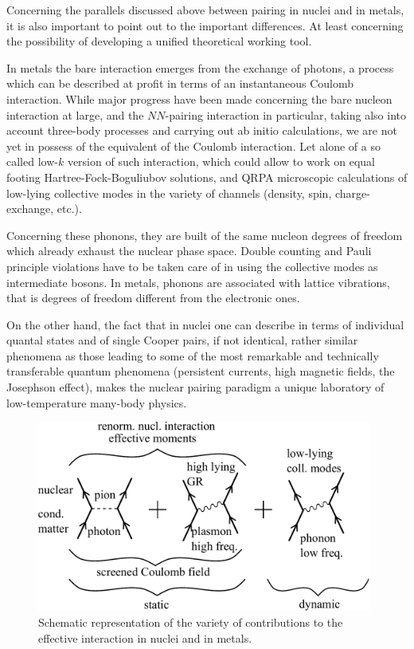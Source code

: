 \begin{subappendices}
Concerning the parallels discussed above between pairing in nuclei and in metals, it is also important to point out to the important differences. At least concerning the possibility of developing a unified theoretical working tool. 

In metals the bare interaction emerges from the exchange of photons, a process which can be described at profit in terms of an instantaneous Coulomb interaction. While major progress have been made concerning the bare nucleon interaction at large, and the $NN$-pairing interaction in particular, taking also into account three-body processes and carrying out ab initio calculations, we are not yet in possess of the equivalent of the Coulomb interaction.  Let alone of a so called low-$k$ version of such interaction, which could allow to work on equal footing Hartree-Fock-Boguliubov solutions, and QRPA microscopic calculations of low-lying collective modes in the variety of channels (density, spin, charge-exchange, etc.).

Concerning these phonons, they are built of the same nucleon degrees of freedom which already exhaust the nuclear phase space. Double counting and Pauli principle violations have to be taken care of in using the collective modes as intermediate bosons. In metals, phonons are associated with lattice vibrations, that is degrees of freedom different from the electronic ones.

On the other hand, the fact that in nuclei one can describe in terms of individual quantal states and of single Cooper pairs, if not identical, rather similar phenomena as those leading to some of the most remarkable and technically transferable quantum phenomena (persistent currents, high magnetic fields, the Josephson effect), makes the nuclear pairing paradigm a unique laboratory of low-temperature many-body physics. 
   \begin{figure}
   	\centerline{\includegraphics*[width=11cm,angle=0	]{nutshell/figs/fig3A4}}
   	\caption{Schematic representation of the variety of contributions to the effective interaction in nuclei and in metals.}\label{fig3.A.4}
   \end{figure}


\end{subappendices}
